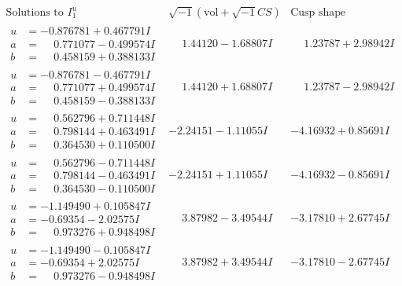\documentclass[1p]{elsarticle_modified}
\theoremstyle{definition}
\newcommand{\I}{\sqrt{-1}}
\begin{document}
$$\begin{array}{c|c|c}  
\text{Solutions to }I^u_{1}& \I (\text{vol} + \sqrt{-1}CS) & \text{Cusp shape}\\
 \hline 
\begin{aligned}
u &= -0.876781 + 0.467791 I \\
a &= \phantom{-}0.771077 - 0.499574 I \\
b &= \phantom{-}0.458159 + 0.388133 I\end{aligned}
 & \phantom{-}1.44120 - 1.68807 I & \phantom{-}1.23787 + 2.98942 I \\ \hline\begin{aligned}
u &= -0.876781 - 0.467791 I \\
a &= \phantom{-}0.771077 + 0.499574 I \\
b &= \phantom{-}0.458159 - 0.388133 I\end{aligned}
 & \phantom{-}1.44120 + 1.68807 I & \phantom{-}1.23787 - 2.98942 I \\ \hline\begin{aligned}
u &= \phantom{-}0.562796 + 0.711448 I \\
a &= \phantom{-}0.798144 + 0.463491 I \\
b &= \phantom{-}0.364530 + 0.110500 I\end{aligned}
 & -2.24151 - 1.11055 I & -4.16932 + 0.85691 I \\ \hline\begin{aligned}
u &= \phantom{-}0.562796 - 0.711448 I \\
a &= \phantom{-}0.798144 - 0.463491 I \\
b &= \phantom{-}0.364530 - 0.110500 I\end{aligned}
 & -2.24151 + 1.11055 I & -4.16932 - 0.85691 I \\ \hline\begin{aligned}
u &= -1.149490 + 0.105847 I \\
a &= -0.69354 - 2.02575 I \\
b &= \phantom{-}0.973276 + 0.948498 I\end{aligned}
 & \phantom{-}3.87982 - 3.49544 I & -3.17810 + 2.67745 I \\ \hline\begin{aligned}
u &= -1.149490 - 0.105847 I \\
a &= -0.69354 + 2.02575 I \\
b &= \phantom{-}0.973276 - 0.948498 I\end{aligned}
 & \phantom{-}3.87982 + 3.49544 I & -3.17810 - 2.67745 I \\ \hline\begin{aligned}

\end{aligned}
\end{array}$$
\end{document}
